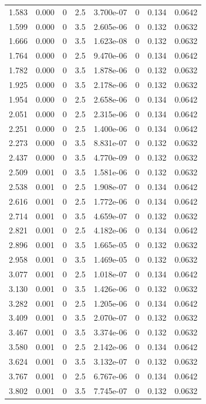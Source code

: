 \documentclass[preview]{standalone}
\begin{document}
{{\begin{tabular}{L{1.2cm}C{1.2cm} C{0.3cm}C{0.5cm} C{1.4cm}C{1.4cm} C{1.4cm}C{1.4cm}}
  1.583  &  0.000  & 0     & 2.5 &  3.700e-07  & 0  & 0.134 &  0.0642   \\ 
  1.599  &  0.000  & 0     & 3.5 &  2.605e-06  & 0  & 0.132 &  0.0632   \\ 
  1.666  &  0.000  & 0     & 3.5 &  1.623e-08  & 0  & 0.132 &  0.0632   \\ 
  1.764  &  0.000  & 0     & 2.5 &  9.470e-06  & 0  & 0.134 &  0.0642   \\ 
  1.782  &  0.000  & 0     & 3.5 &  1.878e-06  & 0  & 0.132 &  0.0632   \\ 
  1.925  &  0.000  & 0     & 3.5 &  2.178e-06  & 0  & 0.132 &  0.0632   \\ 
  1.954  &  0.000  & 0     & 2.5 &  2.658e-06  & 0  & 0.134 &  0.0642   \\ 
  2.051  &  0.000  & 0     & 2.5 &  2.315e-06  & 0  & 0.134 &  0.0642   \\ 
  2.251  &  0.000  & 0     & 2.5 &  1.400e-06  & 0  & 0.134 &  0.0642   \\ 
  2.273  &  0.000  & 0     & 3.5 &  8.831e-07  & 0  & 0.132 &  0.0632   \\ 
  2.437  &  0.000  & 0     & 3.5 &  4.770e-09  & 0  & 0.132 &  0.0632   \\ 
  2.509  &  0.001  & 0     & 3.5 &  1.581e-06  & 0  & 0.132 &  0.0632   \\ 
  2.538  &  0.001  & 0     & 2.5 &  1.908e-07  & 0  & 0.134 &  0.0642   \\ 
  2.616  &  0.001  & 0     & 2.5 &  1.772e-06  & 0  & 0.134 &  0.0642   \\ 
  2.714  &  0.001  & 0     & 3.5 &  4.659e-07  & 0  & 0.132 &  0.0632   \\ 
  2.821  &  0.001  & 0     & 2.5 &  4.182e-06  & 0  & 0.134 &  0.0642   \\ 
  2.896  &  0.001  & 0     & 3.5 &  1.665e-05  & 0  & 0.132 &  0.0632   \\ 
  2.958  &  0.001  & 0     & 3.5 &  1.469e-05  & 0  & 0.132 &  0.0632   \\ 
  3.077  &  0.001  & 0     & 2.5 &  1.018e-07  & 0  & 0.134 &  0.0642   \\ 
  3.130  &  0.001  & 0     & 3.5 &  1.426e-06  & 0  & 0.132 &  0.0632   \\ 
  3.282  &  0.001  & 0     & 2.5 &  1.205e-06  & 0  & 0.134 &  0.0642   \\ 
  3.409  &  0.001  & 0     & 3.5 &  2.070e-07  & 0  & 0.132 &  0.0632   \\ 
  3.467  &  0.001  & 0     & 3.5 &  3.374e-06  & 0  & 0.132 &  0.0632   \\ 
  3.580  &  0.001  & 0     & 2.5 &  2.142e-06  & 0  & 0.134 &  0.0642   \\ 
  3.624  &  0.001  & 0     & 3.5 &  3.132e-07  & 0  & 0.132 &  0.0632   \\ 
  3.767  &  0.001  & 0     & 2.5 &  6.767e-06  & 0  & 0.134 &  0.0642   \\ 
  3.802  &  0.001  & 0     & 3.5 &  7.745e-07  & 0  & 0.132 &  0.0632   \\ 
\hline 
\end{tabular} 

}}
\end{document}
